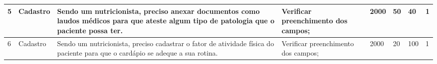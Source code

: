 \begin{apendicesenv}
\begin{landscape}
\begin{table}[h]
\begin{tabular}{|p{0.5cm}|p{2cm}|p{5cm}|p{4cm}|p{2.5cm}|p{3.7cm}|p{2cm}|p{2cm}|}
5                               & Cadastro                          & Sendo um nutricionista, preciso anexar documentos como laudos médicos para que ateste algum tipo de patologia que o paciente possa ter.         & Verificar preenchimento dos campos;                 & 2000                                               & 50                                                          & 40                                       & 1                                   \\ \hline
6                               & Cadastro                          & Sendo um nutricionista, preciso cadastrar o fator de atividade física do paciente para que o cardápio se adeque a sua rotina.                   & Verificar preenchimento dos campos;                 & 2000                                               & 20                                                          & 100                                      & 1                               	\\ \hline
\end{tabular}
\end{table}

\end{landscape}
\end{apendicesenv}

